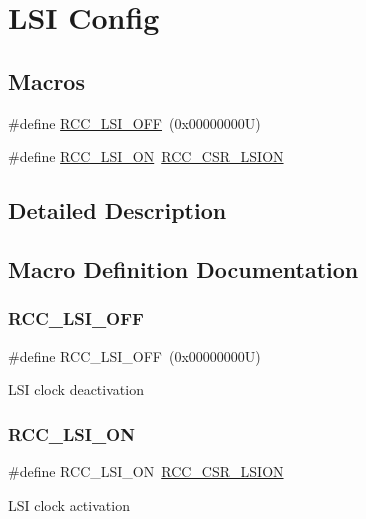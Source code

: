 \hypertarget{group___r_c_c___l_s_i___config}{}\section{L\+SI Config}
\label{group___r_c_c___l_s_i___config}
\subsection*{Macros}
\begin{DoxyCompactItemize}
\item 
\#define \hyperlink{group___r_c_c___l_s_i___config_gaa1710927d79a2032f87f039c4a27356a}{R\+C\+C\+\_\+\+L\+S\+I\+\_\+\+O\+FF}~(0x00000000\+U)
\item 
\#define \hyperlink{group___r_c_c___l_s_i___config_ga6b364ac3500e60b6bff695ee518c87d6}{R\+C\+C\+\_\+\+L\+S\+I\+\_\+\+ON}~\hyperlink{group___peripheral___registers___bits___definition_ga803cbf97bda1ebaf9afee2a3c9f0851b}{R\+C\+C\+\_\+\+C\+S\+R\+\_\+\+L\+S\+I\+ON}
\end{DoxyCompactItemize}


\subsection{Detailed Description}


\subsection{Macro Definition Documentation}
\mbox{\label{group___r_c_c___l_s_i___config_gaa1710927d79a2032f87f039c4a27356a}} 
\subsubsection{\texorpdfstring{R\+C\+C\+\_\+\+L\+S\+I\+\_\+\+O\+FF}{RCC\_LSI\_OFF}}
{\footnotesize\ttfamily \#define R\+C\+C\+\_\+\+L\+S\+I\+\_\+\+O\+FF~(0x00000000\+U)}

L\+SI clock deactivation \mbox{\label{group___r_c_c___l_s_i___config_ga6b364ac3500e60b6bff695ee518c87d6}} 
\subsubsection{\texorpdfstring{R\+C\+C\+\_\+\+L\+S\+I\+\_\+\+ON}{RCC\_LSI\_ON}}
{\footnotesize\ttfamily \#define R\+C\+C\+\_\+\+L\+S\+I\+\_\+\+ON~\hyperlink{group___peripheral___registers___bits___definition_ga803cbf97bda1ebaf9afee2a3c9f0851b}{R\+C\+C\+\_\+\+C\+S\+R\+\_\+\+L\+S\+I\+ON}}

L\+SI clock activation 